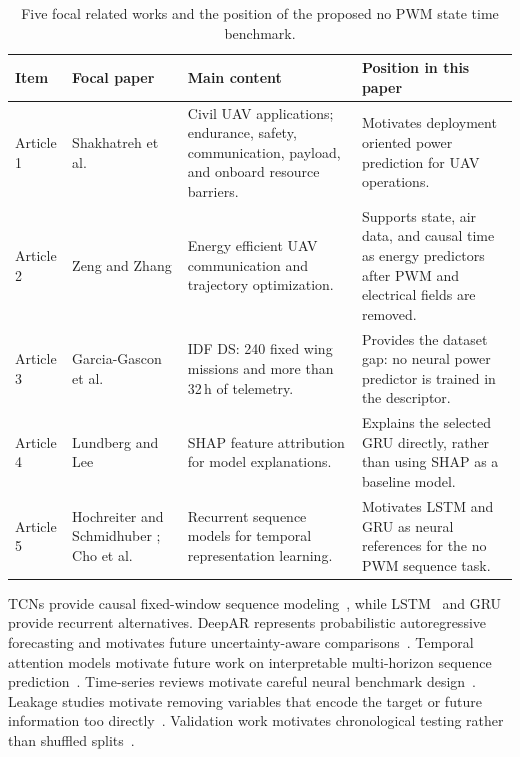 \documentclass[runningheads,a4paper]{llncs}
\begin{document}
\begin{table}[!htbp]
\caption{Five focal related works and the position of the proposed no PWM state time benchmark.}
\label{tab:related}
\centering
{\scriptsize
\renewcommand{\arraystretch}{0.84}
\begin{tabular}{p{1.0cm} p{2.1cm} p{3.9cm} p{3.9cm}}
\toprule
Item & Focal paper & Main content & Position in this paper \\
\midrule
Article 1 & Shakhatreh et al.\ \cite{shakhatreh2019survey} &
  Civil UAV applications; endurance, safety, communication, payload, and onboard resource barriers. &
  Motivates deployment oriented power prediction for UAV operations. \\[1pt]
Article 2 & Zeng and Zhang \cite{zeng2017energy} &
  Energy efficient UAV communication and trajectory optimization. &
  Supports state, air data, and causal time as energy predictors after PWM and electrical fields are removed. \\[1pt]
Article 3 & Garcia-Gascon et al.\ \cite{garcia2026idfds} &
  IDF DS: 240 fixed wing missions and more than 32\,h of telemetry. &
  Provides the dataset gap: no neural power predictor is trained in the descriptor. \\[1pt]
Article 4 & Lundberg and Lee \cite{lundberg2017shap} &
  SHAP feature attribution for model explanations. &
  Explains the selected GRU directly, rather than using SHAP as a baseline model. \\[1pt]
Article 5 & Hochreiter and Schmidhuber \cite{hochreiter1997lstm}; Cho et al.\ \cite{cho2014gru} &
  Recurrent sequence models for temporal representation learning. &
  Motivates LSTM and GRU as neural references for the no PWM sequence task. \\
\bottomrule
\end{tabular}
}
\end{table}

TCNs provide causal fixed-window sequence modeling~\cite{bai2018tcn}, while LSTM~\cite{hochreiter1997lstm} and GRU~\cite{cho2014gru} provide recurrent alternatives. DeepAR represents probabilistic autoregressive forecasting and motivates future uncertainty-aware comparisons~\cite{salinas2020deepar}. Temporal attention models motivate future work on interpretable multi-horizon sequence prediction~\cite{lim2021tft}. Time-series reviews motivate careful neural benchmark design~\cite{fawaz2019dlts}. Leakage studies motivate removing variables that encode the target or future information too directly~\cite{kaufman2012leakage}. Validation work motivates chronological testing rather than shuffled splits~\cite{bergmeir2018cv}.
\end{document}
